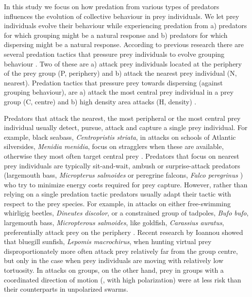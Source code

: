 In this study we focus on how predation from various types of predators influences the evolution of collective behaviour in prey individuals. We let prey individuals evolve their behaviour while experiencing predation from a) predators for which grouping might be a natural response and b) predators for which dispersing might be a natural response. According to previous research there are several predation tactics that pressure prey individuals to evolve grouping behaviour \cite{biswas2014causes,kunz2006prey,olson2013predator,olson2016evolution}. Two of these are a) attack prey individuals located at the periphery of the prey group (P, periphery) and b) attack the nearest prey individual (N, nearest). Predation tactics that pressure prey towards dispersing (against grouping behaviour), are a) attack the most central prey individual in a prey group (C, centre) and b) high density area attacks (H, density) \cite{olson2013predator}.

Predators that attack the nearest, the most peripheral or the most central prey individual usually detect, pursue, attack and capture a single prey individual. For example, black seabass, \emph{Centropristis striata}, in attacks on schools of Atlantic silversides, \emph{Menidia menidia}, focus on stragglers when these are available, otherwise they most often target central prey \cite{parrish1989reexamining}. Predators that focus on nearest prey individuals are typically sit-and-wait, ambush or surprise-attack predators (\eg largemouth bass, \emph{Micropterus salmoides} \cite{savino1982predatorprey} or peregrine falcons, \emph{Falco peregrinus} \cite{zoratto2010aerial}) who try to minimize energy costs required for prey capture. However, rather than relying on a single predation tactic predators usually adapt their tactic with respect to the prey species. For example, in attacks on either free-swimming whirligig beetles, \emph{Dineutes discolor}, or a constrained group of tadpoles, \emph{Bufo bufo}, largemouth bass, \emph{Micropterous salmoides}, like goldfish, \emph{Carassius auratus}, preferentially attack prey on the periphery \cite{romey2008predators}. Recent research by Ioannou\etal \cite{ioannou2012predatory} showed that bluegill sunfish, \emph{Lepomis macrochirus}, when hunting virtual prey disproportionately more often attack prey relatively far from the group centre, but only in the case when prey individuals are moving with relatively low tortuosity. In attacks on groups, on the other hand, prey in groups with a coordinated direction of motion (\ie, with high polarization) were at less risk than their counterparts in unpolarized swarms.


